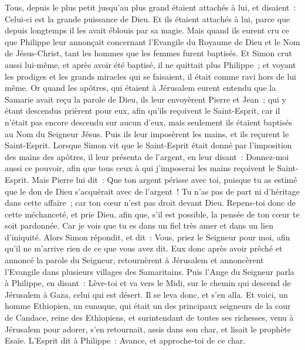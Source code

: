 \begin{multicols}{2}
Tous, depuis le plus petit jusqu'au plus grand étaient attachés à lui, et disaient~: Celui-ci est la grande puissance de Dieu.
Et ils étaient attachés à lui, parce que depuis longtemps il les avait éblouis par sa magie.
Mais quand ils eurent cru ce que Philippe leur annonçait concernant l'Evangile du Royaume de Dieu et le Nom de Jésus-Christ, tant les hommes que les femmes furent baptisés.
Et Simon crut aussi lui-même, et après avoir été baptisé, il ne quittait plus Philippe~; et voyant les prodiges et les grands miracles qui se faisaient, il était comme ravi hors de lui même.
Or quand les apôtres, qui étaient à Jérusalem eurent entendu que la Samarie avait reçu la parole de Dieu, ils leur envoyèrent Pierre et Jean~;
qui y étant descendus prièrent pour eux, afin qu'ils reçoivent le Saint-Esprit,
car il n'était pas encore descendu sur aucun d'eux, mais seulement ils étaient baptisés au Nom du Seigneur Jésus.
Puis ils leur imposèrent les mains, et ils reçurent le Saint-Esprit.
Lorsque Simon vit que le Saint-Esprit était donné par l'imposition des mains des apôtres, il leur présenta de l'argent,
en leur disant~: Donnez-moi aussi ce pouvoir, afin que tous ceux à qui j'imposerai les mains reçoivent le Saint-Esprit.
Mais Pierre lui dit~: Que ton argent périsse avec toi, puisque tu as estimé que le don de Dieu s'acquérait avec de l'argent~!
Tu n'as pas de part ni d'héritage dans cette affaire~; car ton cœur n'est pas droit devant Dieu.
Repens-toi donc de cette méchanceté, et prie Dieu, afin que, s'il est possible, la pensée de ton cœur te soit pardonnée.
Car je vois que tu es dans un fiel très amer et dans un lien d'iniquité.
Alors Simon répondit, et dit~: Vous, priez le Seigneur pour moi, afin qu'il ne m'arrive rien de ce que vous avez dit. 
Eux donc après avoir prêché et annoncé la parole du Seigneur, retournèrent à Jérusalem et annoncèrent l'Evangile dans plusieurs villages des Samaritains.
Puis l'Ange du Seigneur parla à Philippe, en disant~: Lève-toi et va vers le Midi, sur le chemin qui descend de Jérusalem à Gaza, celui qui est désert.
Il se leva donc, et s'en alla. Et voici, un homme Ethiopien, un eunuque, qui était un des principaux seigneurs de la cour de Candace, reine des Ethiopiens, et surintendant de toutes ses richesses, venu à Jérusalem pour adorer,
s'en retournait, assis dans son char, et lisait le prophète Esaïe.
L'Esprit dit à Philippe~: Avance, et approche-toi de ce char.

\end{multicols}
